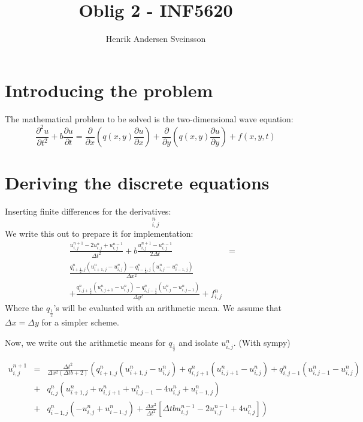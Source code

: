 \documentclass[a4paper]{article}
\title{Oblig 2 - INF5620}
\author{Henrik Andersen Sveinsson}
\begin{document}
\maketitle

\section{Introducing the problem}
The mathematical problem to be solved is the two-dimensional wave equation:
\begin{equation}
\frac{\partial^2 u}{\partial t^2} + b\frac{\partial u}{\partial t} =
\frac{\partial}{\partial x}\left( q (x,y)
\frac{\partial u}{\partial x}\right) +
\frac{\partial}{\partial y}\left( q (x,y)
\frac{\partial u}{\partial y}\right) + f(x,y,t)
\end{equation}

\section{Deriving the discrete equations}
Inserting finite differences for the derivatives:
\begin{equation}
	[D_tD_t u  + b D_{2t} u = D_x q D_x u + D_y q D_y u + f]_{i, j}^n
\end{equation}
We write this out to prepare it for implementation:
\begin{eqnarray}
	\frac{u_{i, j}^{n+1} - 2u_{i,j}^{n} + u_{i, j}^{n-1}}{\Delta t^2} +
	b\frac{u_{i, j}^{n+1}-u_{i, j}^{n-1}}{2\Delta t} &=& \\
	\frac{q_{i+\frac{1}{2}, j}^n \left(u_{i+1, j}^n - u_{i, j}^n\right) -
	q_{i-\frac{1}{2}, j}^n \left(u_{i, j}^n - u_{i-1, j}^n\right)}{\Delta x^2} \\
	+  \frac{q_{i, j+\frac{1}{2}}^n \left(u_{i, j+1}^n - u_{i, j}^n\right) -
	q_{i, j-\frac{1}{2}}^n \left(u_{i, j}^n - u_{i, j-1}^n\right)}{\Delta y^2} + f_{i, j}^n
\end{eqnarray}
Where the $q_\frac{1}{2}$'s will be evaluated with an arithmetic mean. 
We assume that $\Delta x = \Delta y$ for a simpler scheme. 

Now, we write out the arithmetic means for $q_{\frac{1}{2}}$ and isolate $u_{i, j}^n$. (With sympy)

\begin{eqnarray*}
u_{i, j}^{n+1} &=& \frac{\Delta t^2}{\Delta x^{2} \left(\Delta t b + 2\right)} \left( q^{n}_{{i+1, j}} (u^{n}_{{i+1, j}} - u^{{n}}_{{i, j}}) +  q^{n}_{{i, j+1}} (u^{n}_{{i, j+1}} - u^{{n}}_{{i, j}}) +  q^{n}_{{i, j-1}} (u^{n}_{{i, j-1}} - u^{{n}}_{{i, j}}) \right. \\ &+& \left. q^{n}_{{i, j}} (u^{n}_{{i+1, j}} + u^{n}_{{i, j+1}} + u^{n}_{{i, j-1}} - 4  u^{{n}}_{{i, j}} + u^{n}_{{i-1, j}}) \right. \\
&+& \left.  q^{n}_{{i-1, j}} (-u^{{n}}_{{i, j}} +u^{n}_{{i-1, j}}) + \frac{\Delta x^{2}}{\Delta t^2}\left[ \Delta t b u^{{n-1}}_{{i, j}} - 2  u^{{n-1}}_{{i, j}} + 4  u^{{n}}_{{i, j}} \right] \right)
\end{eqnarray*}
\end{document}
